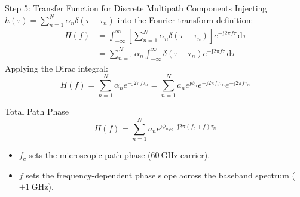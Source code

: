 \documentclass[10pt,aspectratio=169]{beamer}
\newcommand{\dd}{\mathrm{d}}
\newcommand{\jj}{\mathrm{j}}
\begin{document}
\begin{frame}{Step 5: Transfer Function for Discrete Multipath Components}
\small
  Injecting $h(\tau) = \sum_{n=1}^N \alpha_n \delta(\tau - \tau_n)$ into the Fourier transform definition:
  \begin{align}
    H(f) &= \int_{-\infty}^{\infty} \left[ \sum_{n=1}^{N} \alpha_n \delta(\tau - \tau_n) \right] e^{-\jj 2\pi f \tau} \,\dd\tau \nonumber \\
         &= \sum_{n=1}^{N} \alpha_n \int_{-\infty}^{\infty} \delta(\tau - \tau_n) e^{-\jj 2\pi f \tau} \,\dd\tau
  \end{align}
  Applying the Dirac integral:
  \begin{equation}
    \boxed{H(f) = \sum_{n=1}^{N} \alpha_n e^{-\jj 2\pi f \tau_n} = \sum_{n=1}^{N} a_n e^{\jj\phi_n} e^{-\jj 2\pi f_c \tau_n} e^{-\jj 2\pi f \tau_n}}
  \end{equation}
\vspace{-1em}
  \begin{alertblock}{Total Path Phase}
    \begin{equation}
      H(f) = \sum_{n=1}^{N} a_n e^{\jj\phi_n} e^{-\jj 2\pi (f_c + f)\tau_n}
    \end{equation}
    \vspace{-1em}
    \begin{itemize}
      \item $f_c$ sets the microscopic path phase ($\SI{60}{\giga\hertz}$ carrier).
      \item $f$ sets the frequency-dependent phase slope across the baseband spectrum ($\pm \SI{1}{\giga\hertz}$).
    \end{itemize}
  \end{alertblock}
\end{frame}
\end{document}
